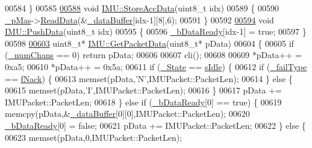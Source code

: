 \begin{DoxyCode}
00584 \}
00585 
\hypertarget{_i_m_u_8cpp_source_l00588}{}\hyperlink{class_i_m_u_ae9c290e496eb2a76aefc626c81fe4da9}{00588} \textcolor{keywordtype}{void} \hyperlink{class_i_m_u_ae9c290e496eb2a76aefc626c81fe4da9}{IMU::StoreAccData}(uint8\_t idx)
00589 \{
00590     \hyperlink{class_i_m_u_a466148932203b7250c83a4c5bb684ca1}{_pMas}->\hyperlink{class_i2_c___master_ab7c8dd50c0e931fb20a73e42b2c2202a}{ReadData}(&\hyperlink{class_i_m_u_ab87a54288295d4d10d605cf6c21d4d0f}{_dataBuffer}[idx-1][8],6);
00591 \}
00592 
\hypertarget{_i_m_u_8cpp_source_l00594}{}\hyperlink{class_i_m_u_a14f3437170b38602f281b3f97d9ce129}{00594} \textcolor{keywordtype}{void} \hyperlink{class_i_m_u_a14f3437170b38602f281b3f97d9ce129}{IMU::PushData}(uint8\_t idx)
00595 \{
00596     \hyperlink{class_i_m_u_a8a71f0728b2d849d1d8e54fcb58aad4e}{_bDataReady}[idx-1] = \textcolor{keyword}{true};
00597 \}
00598 
\hypertarget{_i_m_u_8cpp_source_l00603}{}\hyperlink{class_i_m_u_a4f72b7f99fc42f30c9478ba7ed65654e}{00603} uint8\_t* \hyperlink{class_i_m_u_a4f72b7f99fc42f30c9478ba7ed65654e}{IMU::GetPacketData}(uint8\_t* pData)
00604 \{
00605     \textcolor{keywordflow}{if} (\hyperlink{class_i_m_u_a27df580b4559aaf3234469bfe16eb158}{_numChans} == 0) \textcolor{keywordflow}{return} pData;
00606 
00607     cli();
00608 
00609     *pData++ = 0xa5;
00610     *pData++ = 0x5a;
00611     \textcolor{keywordflow}{if} (\hyperlink{class_i_m_u_a2e3c70d02cc2b3dd98ce8153d02cf04e}{_State} == \hyperlink{class_i_m_u_a7b5e1bf1cf1407b3e4cf0dd2e18b523fa82181a217d68f26cba06b38cfb94c1bc}{sIdle}) \{
00612         \textcolor{keywordflow}{if} (\hyperlink{class_i_m_u_a39ed63b67b50c67520c5f8e5a2c26b26}{_failType} == \hyperlink{class_i_m_u_a4edeb07a848734657792b4ef8749fb97a17dff6c1392332855f9e83033dff49f8}{fNack}) \{
00613             memset(pData,\textcolor{charliteral}{'N'},IMUPacket::PacketLen);
00614         \} \textcolor{keywordflow}{else} \{
00615             memset(pData,\textcolor{charliteral}{'I'},IMUPacket::PacketLen);
00616         \}
00617         pData += IMUPacket::PacketLen;
00618     \} \textcolor{keywordflow}{else} \textcolor{keywordflow}{if} (\hyperlink{class_i_m_u_a8a71f0728b2d849d1d8e54fcb58aad4e}{_bDataReady}[0] == \textcolor{keyword}{true}) \{
00619         memcpy(pData,&\hyperlink{class_i_m_u_ab87a54288295d4d10d605cf6c21d4d0f}{_dataBuffer}[0][0],IMUPacket::PacketLen);
00620         \hyperlink{class_i_m_u_a8a71f0728b2d849d1d8e54fcb58aad4e}{_bDataReady}[0] = \textcolor{keyword}{false};
00621         pData += IMUPacket::PacketLen;
00622     \} \textcolor{keywordflow}{else} \{
00623         memset(pData,0,IMUPacket::PacketLen);

\end{DoxyCode}

